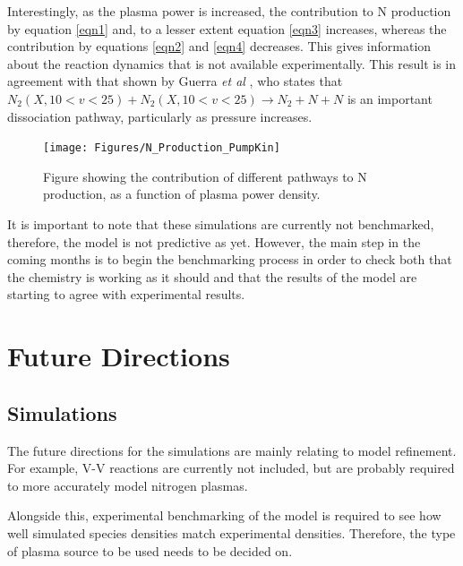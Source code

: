 \documentclass[11pt, oneside]{article}   	%
\begin{document}
Interestingly, as the plasma power is increased, the contribution to N production by equation \ref{eqn1} and, to a lesser extent equation \ref{eqn3} increases, whereas the contribution by equations \ref{eqn2} and \ref{eqn4} decreases.
This gives information about the reaction dynamics that is not available experimentally.
This result is in agreement with that shown by Guerra \textit{et al} \cite{Guerra2004kinetic}, who states that $N_2(X, 10<v<25) + N_2(X, 10<v<25) \rightarrow N_2 + N + N $ is an important dissociation pathway, particularly as pressure increases.

\begin{figure}
\texttt{[image: Figures/N\_Production\_PumpKin]}
\caption{Figure showing the contribution of different pathways to N production, as a function of plasma power density.}
\label{fig:pumpkin}
\end{figure}

It is important to note that these simulations are currently not benchmarked, therefore, the model is not predictive as yet.
However, the main step in the coming months is to begin the benchmarking process in order to check both that the chemistry is working as it should and that the results of the model are starting to agree with experimental results.

\section{Future Directions}
\subsection{Simulations}
The future directions for the simulations are mainly relating to model refinement.
For example, V-V reactions are currently not included, but are probably required to more accurately model nitrogen plasmas.

Alongside this, experimental benchmarking of the model is required to see how well simulated species densities match experimental densities.
Therefore, the type of plasma source to be used needs to be decided on.
\end{document}
